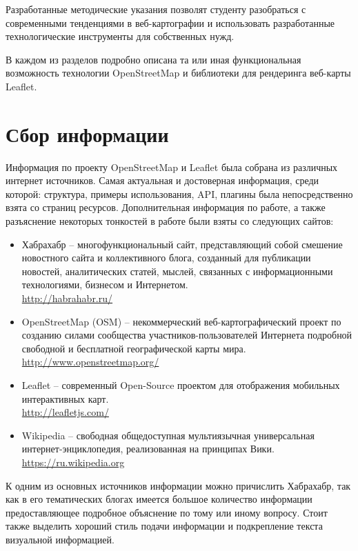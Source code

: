 \documentclass[a4paper, 14pt]{extreport}
\begin{document}
    Разработанные методические указания позволят студенту разобраться с современными тенденциями в веб-картографии и 
    использовать разработанные технологические инструменты для собственных нужд.  

    В каждом из разделов подробно описана та или иная функциональная возможность технологии OpenStreetMap и 
    библиотеки для рендеринга веб-карты Leaflet.

    \section{Сбор информации}
    Информация по проекту OpenStreetMap и Leaflet была собрана из различных интернет источников. Самая актуальная и 
    достоверная информация, среди которой: структура, примеры использования, API, плагины была непосредственно взята 
    со страниц ресурсов. Дополнительная информация по работе, а также разъяснение некоторых тонкостей в работе были 
    взяты со следующих сайтов:
    \begin{itemize}
        \item Хабрахабр -- многофункциональный сайт, представляющий собой смешение новостного сайта и коллективного 
            блога, созданный для публикации новостей, аналитических статей, мыслей, связанных с информационными 
            технологиями, бизнесом и Интернетом.\\ \url{http://habrahabr.ru/}
        \item OpenStreetMap (OSM) -- некоммерческий веб-картографический проект по созданию силами сообщества 
            участников-пользователей Интернета подробной свободной и бесплатной географической карты мира.\\
            \url{http://www.openstreetmap.org/}
        \item Leaflet -- современный Open-Source проектом для отображения мобильных интерактивных карт.\\
            \url{http://leafletjs.com/}
        \item Wikipedia -- свободная общедоступная мультиязычная универсальная \\интернет-энциклопедия, реализованная 
            на принципах Вики.\\ \url{https://ru.wikipedia.org}
    \end{itemize}
    
    К одним из основных источников информации можно причислить Хабрахабр, так  как в его тематических блогах имеется 
    большое количество информации предоставляющее подробное объяснение по тому или иному вопросу. Стоит также выделить 
    хороший стиль подачи информации и подкрепление текста визуальной информацией.
\end{document}
